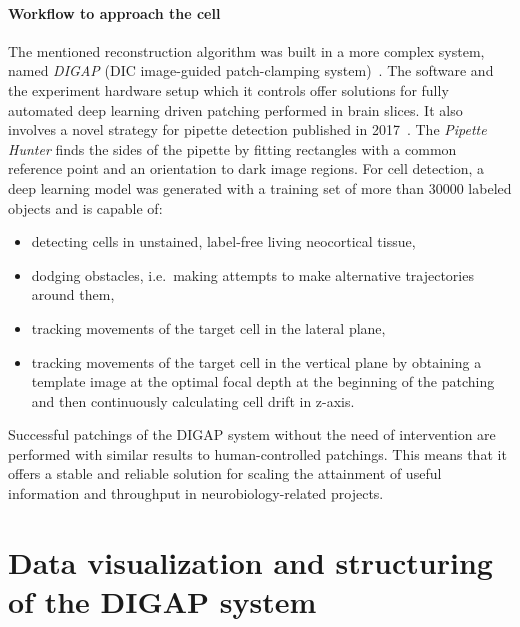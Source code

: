 \documentclass[12pt,a4paper]{report}
\begin{document}
\subsubsection{Workflow to approach the cell}
The mentioned reconstruction algorithm was built in a more complex system, named \textit{DIGAP} (DIC image-guided patch-clamping system)~\cite{koos2020}. The software and the experiment hardware setup which it controls offer solutions for fully automated deep learning driven patching performed in brain slices. It also involves a novel strategy for pipette detection published in 2017~\cite{koos2017}. The \textit{Pipette Hunter} finds the sides of the pipette by fitting rectangles with a common reference point and an orientation to dark image regions. For cell detection, a deep learning model was generated with a training set of more than 30000 labeled objects and is capable of:
\begin{itemize}
    \item detecting cells in unstained, label-free living neocortical tissue,
    \item dodging obstacles, i.e.\ making attempts to make alternative trajectories around them,
    \item tracking movements of the target cell in the lateral plane,
    \item tracking movements of the target cell in the vertical plane by obtaining a template image at the optimal focal depth at the beginning of the patching and then continuously calculating cell drift in z-axis.
\end{itemize}
Successful patchings of the DIGAP system without the need of intervention are performed with similar results to human-controlled patchings. This means that it offers a stable and reliable solution for scaling the attainment of useful information and throughput in neurobiology-related projects.

\chapter{Data visualization and structuring of the DIGAP system}
\end{document}
